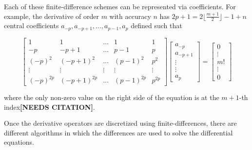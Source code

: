 \documentclass{report}
\begin{document}
                Each of these finite-difference schemes can be represented via coefficients.  For example, the derivative of order $m$ with accuracy $n$ has $2p + 1 = 2 \lfloor \frac{m + 1}{2} \rfloor - 1 + n$ central coefficients $a_{-p}, a_{-p + 1}, \ldots, a_{p - 1}, a_p$ defined such that

                \begin{equation}
                    \begin{bmatrix}
                        1         & 1             & \ldots & 1            & 1 \\
                        -p        & -p + 1        & \ldots & p - 1        & p \\
                        (-p)^2    & (-p + 1)^2    & \ldots & (p - 1)^2    & p^2 \\
                        \vdots    & \vdots        & \vdots & \vdots       & \vdots \\
                        (-p)^{2p} & (-p + 1)^{2p} & \ldots & (p - 1)^{2p} & p^{2p} 
                    \end{bmatrix}
                    \begin{bmatrix}
                        a_{-p} \\
                        a_{-p + 1} \\
                        \vdots \\
                        \vdots \\
                        a_p
                    \end{bmatrix} = 
                    \begin{bmatrix}
                        0 \\
                        \vdots \\
                        m! \\
                        \vdots \\
                        0
                    \end{bmatrix}
                \end{equation}

                where the only non-zero value on the right side of the equation is at the $m+1$-th index\textbf{[NEEDS CITATION]}.
                
                Once the derivative operators are discretized using finite-differences, there are different algorithms in which the differences are used to solve the differential equations.
\end{document}
